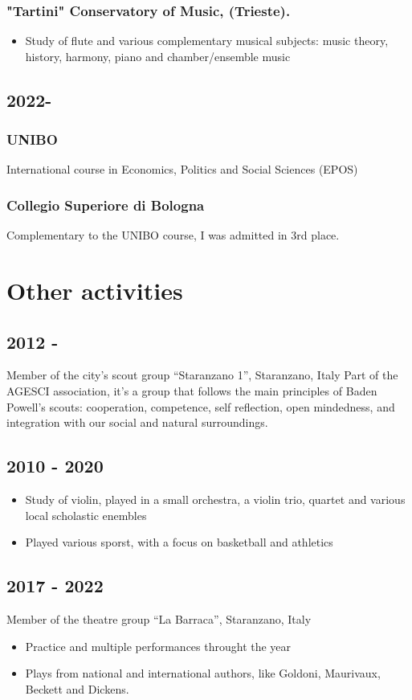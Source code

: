\documentclass[12pt]{article}
\begin{document}
\subsubsection{"Tartini" Conservatory of Music, (Trieste).}
\begin{itemize}
	\item{Study of flute and various complementary musical subjects: music theory, history, harmony, piano and chamber/ensemble music}
\end{itemize}
\subsection{2022-}
\subsubsection{UNIBO}
International course in Economics, Politics and Social Sciences (EPOS)
\subsubsection{Collegio Superiore di Bologna} %
Complementary to the UNIBO course, I was admitted in 3rd place.

\section{Other activities}
	\subsection{2012 -}
	Member of the city’s scout group “Staranzano 1”, Staranzano, Italy
Part of the AGESCI association, it's a group that follows the main principles of Baden Powell's scouts: cooperation, competence, self reflection, open mindedness, and integration with our social and natural surroundings.
    \subsection{2010 - 2020}
	    \begin{itemize}
			\item{Study of violin, played in a small orchestra, a violin trio, quartet and  various local scholastic enembles}
			\item{Played various sporst, with a focus on basketball and athletics}
		\end{itemize}
	\subsection{2017 - 2022}
	Member of the theatre group “La Barraca”, Staranzano, Italy
 	\begin{itemize}
		\item{Practice and multiple performances throught the year}
		\item{Plays from national and international authors, like Goldoni, Maurivaux, Beckett and Dickens.}
	\end{itemize}
\end{document}
